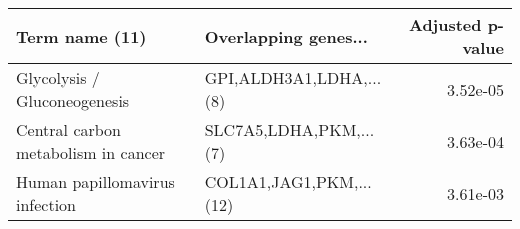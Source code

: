 \begin{tabular}{llr}
\toprule
                     Term name (11) &    Overlapping genes... &  Adjusted p-value \\
\midrule
       Glycolysis / Gluconeogenesis & GPI,ALDH3A1,LDHA,...(8) &          3.52e-05 \\
Central carbon metabolism in cancer &  SLC7A5,LDHA,PKM,...(7) &          3.63e-04 \\
     Human papillomavirus infection & COL1A1,JAG1,PKM,...(12) &          3.61e-03 \\
\bottomrule
\end{tabular}
